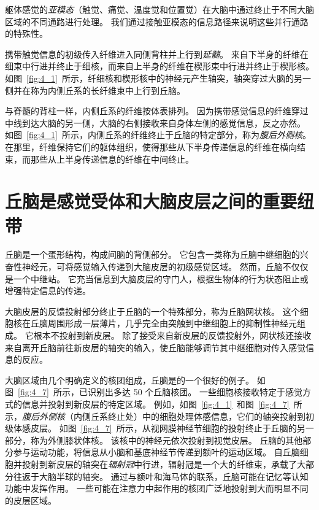 躯体感觉的\textit{亚模态}（触觉、痛觉、温度觉和位置觉）在大脑中通过终止于不同大脑区域的不同通路进行处理。
我们通过接触亚模态的信息路径来说明这些并行通路的特殊性。


携带触觉信息的初级传入纤维进入同侧背柱并上行到\textit{延髓}。
来自下半身的纤维在细束中行进并终止于细核，而来自上半身的纤维在楔形束中行进并终止于楔形核。
如图~\ref{fig:4_1}~所示，纤细核和楔形核中的神经元产生轴突，轴突穿过大脑的另一侧并在称为内侧丘系的长纤维束中上行到丘脑。


与脊髓的背柱一样，内侧丘系的纤维按体表排列。
因为携带感觉信息的纤维穿过中线到达大脑的另一侧，大脑的右侧接收来自身体左侧的感觉信息，反之亦然。
如图~\ref{fig:4_1}~所示，内侧丘系的纤维终止于丘脑的特定部分，称为\textit{腹后外侧核}。
在那里，纤维保持它们的躯体组织，使得那些从下半身传递信息的纤维在横向结束，而那些从上半身传递信息的纤维在中间终止。



\section{丘脑是感觉受体和大脑皮层之间的重要纽带}

丘脑是一个蛋形结构，构成间脑的背侧部分。
它包含一类称为丘脑中继细胞的兴奋性神经元，可将感觉输入传递到大脑皮层的初级感觉区域。 
然而，丘脑不仅仅是一个中继站。 
它充当信息到大脑皮层的守门人，根据生物体的行为状态阻止或增强特定信息的传递。


大脑皮层的反馈投射部分终止于丘脑的一个特殊部分，称为丘脑网状核。 
这个细胞核在丘脑周围形成一层薄片，几乎完全由突触到中继细胞上的抑制性神经元组成。 
它根本不投射到新皮层。 
除了接受来自新皮层的反馈投射外，网状核还接收来自离开丘脑前往新皮层的轴突的输入，使丘脑能够调节其中继细胞对传入感觉信息的反应。


大脑区域由几个明确定义的核团组成，丘脑是的一个很好的例子。
如图~\ref{fig:4_7}~所示，已识别出多达 50 个丘脑核团。
一些细胞核接收特定于感觉方式的信息并投射到新皮层的特定区域。
例如，如图~\ref{fig:4_1}~和图~\ref{fig:4_7}~所示，\textit{腹后外侧核}（内侧丘系终止处）中的细胞处理体感信息，它们的轴突投射到初级体感皮层。
如图~\ref{fig:4_7}~所示，从视网膜神经节细胞的投射终止于丘脑的另一部分，称为外侧膝状体核。 
该核中的神经元依次投射到视觉皮层。 
丘脑的其他部分参与运动功能，将信息从小脑和基底神经节传递到额叶的运动区域。 
自丘脑细胞并投射到新皮层的轴突在\textit{辐射冠}中行进，辐射冠是一个大的纤维束，承载了大部分往返于大脑半球的轴突。
通过与额叶和海马体的联系，丘脑可能在记忆等认知功能中发挥作用。 
一些可能在注意力中起作用的核团广泛地投射到大而明显不同的皮层区域。


